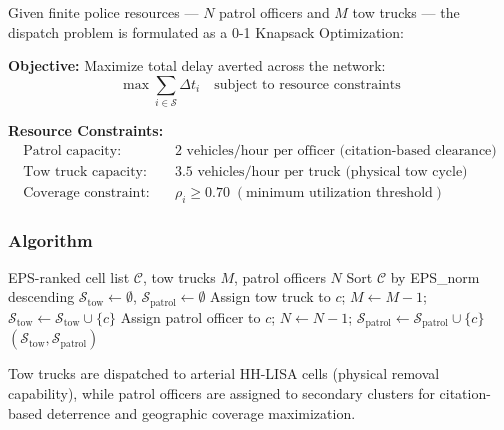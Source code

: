 \documentclass[12pt,a4paper]{article}
\begin{document}
Given finite police resources — $N$ patrol officers and $M$ tow trucks — the dispatch problem is formulated as a 0-1 Knapsack Optimization:

\begin{tcolorbox}[formulabox]
\noindent\textbf{Objective:} Maximize total delay averted across the network:
\begin{equation}
    \max \sum_{i \in \mathcal{S}} \Delta t_i \quad \text{subject to resource constraints}
    \label{eq:knapsack_obj}
\end{equation}

\noindent\textbf{Resource Constraints:}
\begin{align}
    \text{Patrol capacity:} & \quad \text{2 vehicles/hour per officer (citation-based clearance)} \\
    \text{Tow truck capacity:} & \quad \text{3.5 vehicles/hour per truck (physical tow cycle)} \\
    \text{Coverage constraint:} & \quad \rho_i \geq 0.70 \; (\text{minimum utilization threshold})
\end{align}
\end{tcolorbox}

\subsubsection{Algorithm}

\begin{algorithm}[H]
\caption{Greedy Knapsack Dispatch Allocator}
\begin{algorithmic}[1]
\Require EPS-ranked cell list $\mathcal{C}$, tow trucks $M$, patrol officers $N$
\State Sort $\mathcal{C}$ by EPS\_norm descending
\State $\mathcal{S}_\text{tow} \gets \emptyset$, $\mathcal{S}_\text{patrol} \gets \emptyset$
        \State Assign tow truck to $c$; $M \gets M - 1$; $\mathcal{S}_\text{tow} \gets \mathcal{S}_\text{tow} \cup \{c\}$
        \State Assign patrol officer to $c$; $N \gets N - 1$; $\mathcal{S}_\text{patrol} \gets \mathcal{S}_\text{patrol} \cup \{c\}$
    \EndIf
\EndFor
\State \Return $(\mathcal{S}_\text{tow}, \mathcal{S}_\text{patrol})$
\end{algorithmic}
\end{algorithm}

Tow trucks are dispatched to arterial HH-LISA cells (physical removal capability), while patrol officers are assigned to secondary clusters for citation-based deterrence and geographic coverage maximization.
\end{document}
